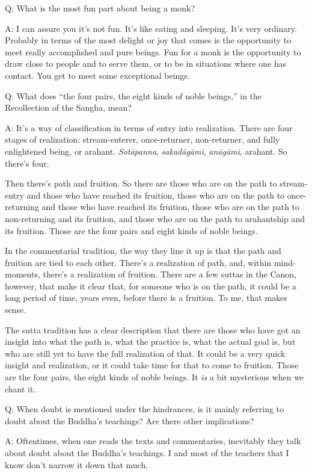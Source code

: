 \qaspace
Q: What is the most fun part about being a monk?

\qaspace
A: I can assure you it’s not fun. It’s like eating and sleeping. It’s
very ordinary. Probably in terms of the most delight or joy that comes
is the opportunity to meet really accomplished and pure beings. Fun for
a monk is the opportunity to draw close to people and to serve them, or
to be in situations where one has contact. You get to meet some
exceptional beings.

\qaspace
Q: What does “the four pairs, the eight kinds of noble beings,” in the
Recollection of the Sangha, mean?

\qaspace
A: It’s a way of classification in terms of entry into realization.
There are four stages of realization: stream-enterer, once-returner,
non-returner, and fully enlightened being, or arahant. \emph{Sotāpanna},
\emph{sakadāgāmi}, \emph{anāgāmi}, arahant. So there’s four.

Then there’s path and fruition. So there are those who are on the path
to stream-entry and those who have reached its fruition, those who are
on the path to once-returning and those who have reached its fruition,
those who are on the path to non-returning and its fruition, and those
who are on the path to arahantship and its fruition. Those are the four
pairs and eight kinds of noble beings.

In the commentarial tradition, the way they line it up is that the path
and fruition are tied to each other. There’s a realization of path, and,
within mind-moments, there’s a realization of fruition. There are a few
suttas in the Canon, however, that make it clear that, for someone who
is on the path, it could be a long period of time, years even, before
there is a fruition. To me, that makes sense.

The sutta tradition has a clear description that there are those who
have got an insight into what the path is, what the practice is, what
the actual goal is, but who are still yet to have the full realization
of that. It could be a very quick insight and realization, or it could
take time for that to come to fruition. Those are the four pairs, the
eight kinds of noble beings. It \emph{is} a bit mysterious when we chant
it.

\qaspace
Q: When doubt is mentioned under the hindrances, is it mainly referring
to doubt about the Buddha’s teachings? Are there other implications?

\qaspace
A: Oftentimes, when one reads the texts and commentaries, inevitably
they talk about doubt about the Buddha’s teachings. I and most of the
teachers that I know don’t narrow it down that much.

